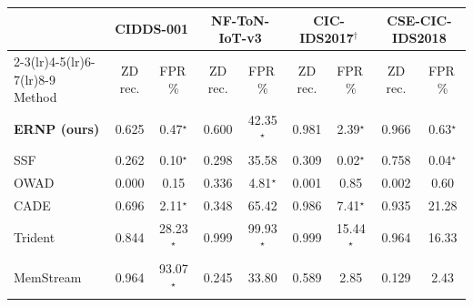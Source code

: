 \begin{tabular}{lcccccccc}
\toprule
 & \multicolumn{2}{c}{CIDDS-001} & \multicolumn{2}{c}{NF-ToN-IoT-v3} & \multicolumn{2}{c}{CIC-IDS2017$^\dagger$} & \multicolumn{2}{c}{CSE-CIC-IDS2018}\\
\cmidrule(lr){2-3}\cmidrule(lr){4-5}\cmidrule(lr){6-7}\cmidrule(lr){8-9}
Method & ZD rec. & FPR\,\% & ZD rec. & FPR\,\% & ZD rec. & FPR\,\% & ZD rec. & FPR\,\%\\
\midrule
\textbf{ERNP (ours)} & 0.625 & 0.47$^\star$ & 0.600 & 42.35$^\star$ & 0.981 & 2.39$^\star$ & 0.966 & 0.63$^\star$\\
SSF & 0.262 & 0.10$^\star$ & 0.298 & 35.58 & 0.309 & 0.02$^\star$ & 0.758 & 0.04$^\star$\\
OWAD & 0.000 & 0.15 & 0.336 & 4.81$^\star$ & 0.001 & 0.85 & 0.002 & 0.60\\
CADE & 0.696 & 2.11$^\star$ & 0.348 & 65.42 & 0.986 & 7.41$^\star$ & 0.935 & 21.28\\
Trident & 0.844 & 28.23$^\star$ & 0.999 & 99.93$^\star$ & 0.999 & 15.44$^\star$ & 0.964 & 16.33\\
MemStream & 0.964 & 93.07$^\star$ & 0.245 & 33.80 & 0.589 & 2.85 & 0.129 & 2.43\\
\bottomrule
\end{tabular}
